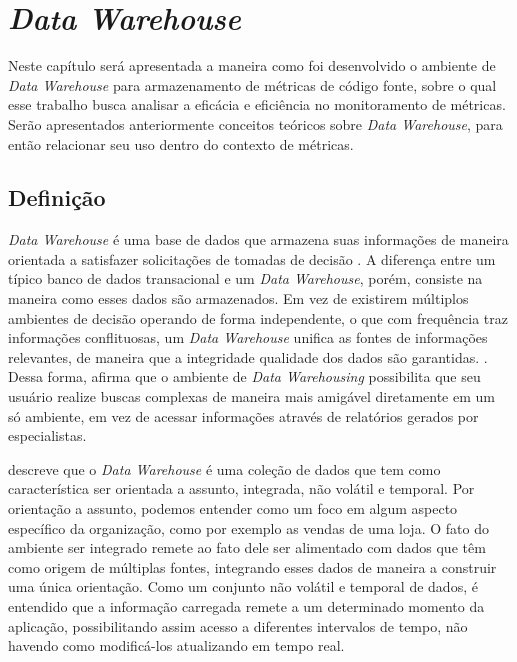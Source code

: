 \chapter{\textit{Data Warehouse}} 
\label{chap:arquitetura}

Neste capítulo será apresentada a maneira como foi desenvolvido o ambiente de \textit{Data Warehouse} para armazenamento de métricas de código fonte, sobre o qual esse trabalho busca analisar a eficácia e eficiência no monitoramento de métricas. Serão apresentados anteriormente conceitos teóricos sobre \textit{Data Warehouse}, para então relacionar seu uso dentro do contexto de métricas. 

\section{Definição}

\textit{Data Warehouse} é uma base de dados que armazena suas informações de maneira orientada a satisfazer solicitações de tomadas de decisão \cite{chaudhuri1997}. A diferença entre um típico banco de dados transacional e um  \textit{Data Warehouse}, porém, consiste na maneira como esses dados são armazenados. Em vez de existirem múltiplos ambientes de decisão operando de forma independente, o que com frequência traz informações conflituosas, um \textit{Data Warehouse} unifica as fontes de informações relevantes, de maneira que a integridade  qualidade dos dados são garantidas. \cite{neeraj_sharma_2011}. Dessa forma, afirma que o ambiente de \textit{Data Warehousing} possibilita que seu usuário realize buscas complexas de maneira mais amigável diretamente em um só ambiente, em vez de acessar informações através de relatórios gerados por especialistas. 

 descreve que o \textit{Data Warehouse} é uma coleção de dados que tem como característica ser orientada a assunto, integrada, não volátil e temporal. Por orientação a assunto, podemos entender como um foco em algum aspecto específico da organização, como por exemplo as vendas de uma loja. O fato do ambiente ser integrado remete ao fato dele ser alimentado com dados que têm como origem de múltiplas fontes, integrando esses dados de maneira a construir uma única orientação. Como um conjunto não volátil e temporal de dados, é entendido que a informação carregada remete a um determinado momento da aplicação, possibilitando assim acesso a diferentes intervalos de tempo, não havendo como modificá-los atualizando em tempo real.

